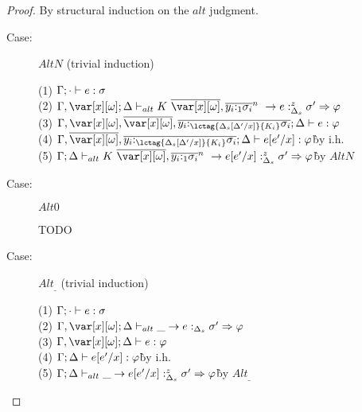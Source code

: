 \begin{proof}
By structural induction on the $alt$ judgment.

\begin{description}
\item[Case:] $AltN$ (trivial induction)
\begin{tabbing}
    (1) $\Gamma; \cdot \vdash e : \sigma$\\
    (2) $\G,\xo;\D \vdash_{alt} \konstructor~\to e :^z_{\D_s} \s' \Rightarrow \vp$\\
    (3) $\G,\xo,\ov{\xo},\ov{y_i{:}_{\lctag{\subst{\D_s}{\D'}{x}}{K_i}}\s_i}; \D \vdash e : \vp $\\
    (4) $\G,\ov{\xo},\ov{y_i{:}_{\lctag{\subst{\D_s}{\D'}{x}}{K_i}}\s_i}; \D \vdash e[e'/x] : \vp $\` by i.h.\\
    (5) $\G;\D \vdash_{alt} \konstructor~\to e[e'/x] :^z_{\D_s} \s' \Rightarrow \vp$\` by $AltN$\\
\end{tabbing}

\item[Case:] $Alt0$
\begin{tabbing}
    TODO
\end{tabbing}

\item[Case:] $Alt_\_$ (trivial induction)
\begin{tabbing}
    (1) $\Gamma;\cdot \vdash e : \sigma$\\
    (2) $\G,\xo;\D \vdash_{alt} \_ \to e :_{\D_s} \s' \Rightarrow \vp$\\
    (3) $\G,\xo;\D \vdash e : \vp$\\
    (4) $\Gamma;\Delta \vdash e[e'/x] : \varphi$\` by i.h.\\
    (5) $\Gamma;\Delta \vdash_{alt} \_ \to e[e'/x] :^z_{\Delta_s} \sigma' \Rightarrow \varphi$\` by $Alt_\_$\\
\end{tabbing}

\end{description}
\end{proof}
